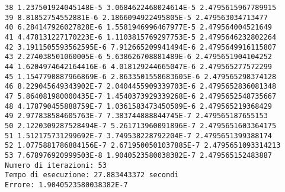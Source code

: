 \documentclass[12pt]{article}
\begin{document}
\begin{verbatim}
38 1.237501924045148E-5 3.0684622468024614E-5 2.4795615967789915
39 8.81852754552881E-6 2.1866094922495805E-5 2.479563034713477
40 6.284147926027828E-6 1.5581946996467977E-5 2.479564004521649
41 4.478131227170223E-6 1.1103815769297753E-5 2.4795646232802264
42 3.1911505593562595E-6 7.912665209941494E-6 2.4795649916115807
43 2.274038501060005E-6 5.638626708881489E-6 2.4795651904104252
44 1.6204974642164416E-6 4.018129244665047E-6 2.479565277572299
45 1.1547790887966869E-6 2.8633501558683605E-6 2.479565298374128
46 8.229045649343902E-7 2.0404455909339703E-6 2.4795652836081348
47 5.864081980000435E-7 1.4540373929339268E-6 2.4795652548735667
48 4.178790455888759E-7 1.0361583473450509E-6 2.479565219368429
49 2.977838584605763E-7 7.383744888844745E-7 2.479565187655153
50 2.1220309287528494E-7 5.261713960091896E-7 2.4795651603364175
51 1.512175731299692E-7 3.749538228792204E-7 2.4795651399388174
52 1.0775881786884156E-7 2.6719500501037885E-7 2.4795651093314213
53 7.678976920999503E-8 1.9040523580038382E-7 2.479565152483887
Numero di iterazioni: 53
Tempo di esecuzione: 27.883443372 secondi
Errore: 1.9040523580038382E-7
\end{verbatim}
\clearpage
\nocite{*}
\printbibliography[heading=bibintoc,type=book,title={Bibliografia}]
\printbibliography[heading=bibintoc,type=online,title={Sitografia}]
\end{document}
